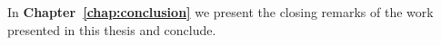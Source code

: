 \vspace*{.5cm}
In \textbf{Chapter~\ref{chap:conclusion}} we present the closing remarks of the work presented in this thesis and conclude.







